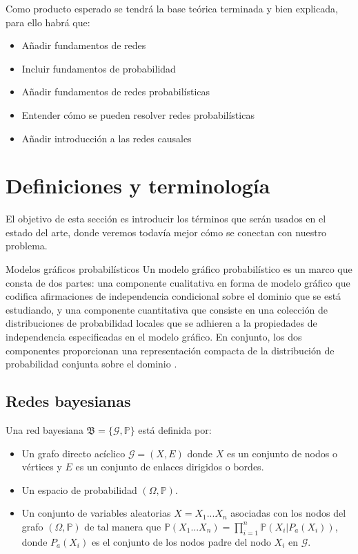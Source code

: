 Como producto esperado se tendrá la base teórica terminada y bien explicada, para ello habrá que: 

\begin{itemize}
    \item Añadir fundamentos de redes
    \item Incluir fundamentos de probabilidad 
    \item Añadir fundamentos de redes probabilísticas 
    \item Entender cómo se pueden resolver redes probabilísticas 
    \item Añadir introducción a las redes causales 
\end{itemize}

\section{Definiciones y terminología}
El objetivo de esta sección es introducir los términos que serán usados en el estado del arte, donde veremos 
todavía mejor cómo se conectan con nuestro problema.

\begin{definicion}{Modelos gráficos probabilísticos} \label{subsect:modelos}
Un modelo gráfico probabilístico es un marco que consta de dos partes: una componente cualitativa
en forma de modelo gráfico que codifica afirmaciones de independencia condicional sobre el 
dominio que se está estudiando, y una componente cuantitativa que consiste en una colección de 
distribuciones de probabilidad locales que se adhieren a la propiedades de independencia especificadas 
en el modelo gráfico. En conjunto, los dos componentes proporcionan una representación compacta de la 
distribución de probabilidad conjunta sobre el dominio \cite{inference-rev-hbn}. 
\end{definicion}

\subsection{Redes bayesianas}
\begin{definicion} \label{def:BN}
Una red bayesiana \cite{def-bncn} $\mathfrak{B} = \lbrace \mathcal{G}, \mathbb{P} \rbrace$ está definida por:
\begin{itemize}
    \item Un grafo directo acíclico $\mathcal{G}=(X,E)$ donde $X$ es un conjunto de nodos o vértices y $E$ 
    es un conjunto de enlaces dirigidos o bordes.
    \item Un espacio de probabilidad $(\Omega, \mathbb{P})$.
    \item Un conjunto de variables aleatorias $X={X_1...X_n}$ asociadas con los nodos del grafo $(\Omega, \mathbb{P})$ 
    de tal manera que $\mathbb{P}(X_1...X_n)= \prod_{i=1}^{n}\mathbb{P}(X_i|P_a(X_i))$, donde $P_a(X_i)$ es el 
    conjunto de los nodos padre del nodo $X_i$ en $\mathcal{G}$.  
\end{itemize}
\end{definicion}

